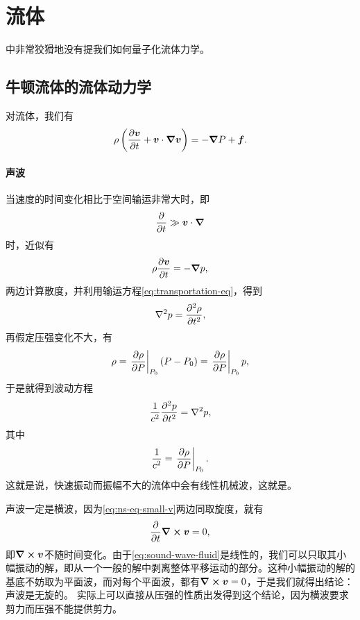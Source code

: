 \part{流体}

\cite{eft-fluid-rel}中非常狡猾地没有提我们如何量子化流体力学。

\chapter{牛顿流体的流体动力学}

对流体，我们有
\begin{equation}
    \rho \left( \pdv{\vb*{v}}{t} + \vb*{v} \cdot \grad{\vb*{v}} \right) = - \grad{P} + \vb*{f}.
\end{equation}

\subsection{声波}

当速度的时间变化相比于空间输运非常大时，即
\[
    \pdv{t} \gg \vb*{v} \cdot \grad
\]
时，近似有
\begin{equation}
    \rho \pdv{\vb*{v}}{t} = - \grad{p},
    \label{eq:ns-eq-small-v}
\end{equation}
两边计算散度，并利用输运方程\eqref{eq:transportation-eq}，得到
\[
    \laplacian{p} = \pdv[2]{\rho}{t},
\]
再假定压强变化不大，有
\[
    \rho = \eval{\pdv{\rho}{P}}_{P_0} (P - P_0) = \eval{\pdv{\rho}{P}}_{P_0} p,
\]
于是就得到波动方程
\begin{equation}
    \frac{1}{c^2} \pdv[2]{p}{t} = \laplacian{p},
    \label{eq:sound-wave-fluid}
\end{equation}
其中
\begin{equation}
    \frac{1}{c^2} = \eval{\pdv{\rho}{P}}_{P_0}.
\end{equation}
这就是说，快速振动而振幅不大的流体中会有线性机械波，这就是。

声波一定是横波，因为\eqref{eq:ns-eq-small-v}两边同取旋度，就有
\[
    \pdv{t} \curl{\vb*{v}} = 0, 
\]
即$\curl{\vb*{v}}$不随时间变化。由于\eqref{eq:sound-wave-fluid}是线性的，我们可以只取其小幅振动的解，即从一个一般的解中剥离整体平移运动的部分。这种小幅振动的解的基底不妨取为平面波，而对每个平面波，都有$\curl{\vb*{v}}=0$，于是我们就得出结论：声波是无旋的。
实际上可以直接从压强的性质出发得到这个结论，因为横波要求剪力而压强不能提供剪力。